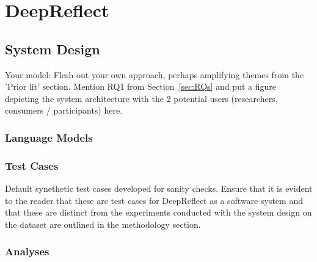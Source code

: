 
\section{DeepReflect}

\subsection{System Design}\label{sec:deepreflect}
\textcolor{black!40}{Your model: Flesh out your own approach, perhaps amplifying themes from the 'Prior lit' section. Mention RQ1 from Section~\ref{sec:RQs} and put a figure depicting the system architecture with the 2 potential users (researchers, consumers / participants) here.}
\subsubsection{Language Models}
\textcolor{black!30}{\lipsum[8-8]}
\subsubsection{Test Cases}
\textcolor{black!40}{Default synethetic test cases developed for sanity checks.}
\textcolor{black!40}{Ensure that it is evident to the reader that these are test cases for DeepReflect as a software system and that these are distinct from the experiments conducted with the system design on the dataset are outlined in the methodology section.}
\textcolor{black!30}{\lipsum[9-9]}

\subsubsection{Analyses}
\textcolor{black!30}{\lipsum[10-10]}

